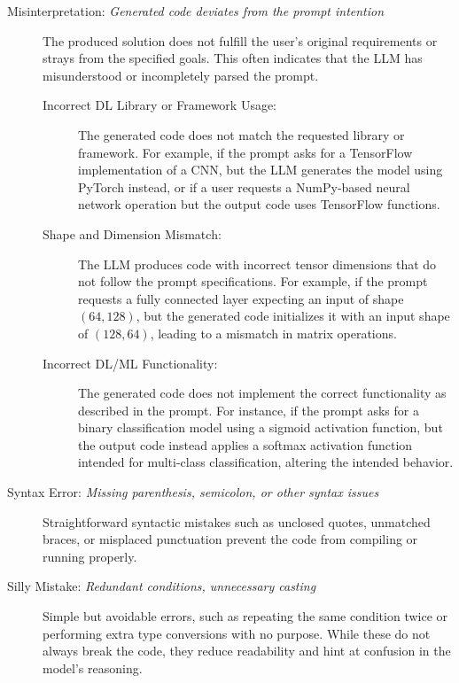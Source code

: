 \begin{description}

\item[Misinterpretation: \textit{Generated code deviates from the prompt intention}]  
The produced solution does not fulfill the user’s original requirements or strays from the specified goals. This often indicates that the LLM has misunderstood or incompletely parsed the prompt.
    
\begin{description}
\item[Incorrect DL Library or Framework Usage:] The generated code does not match the requested library or framework. For example, if the prompt asks for a TensorFlow implementation of a CNN, but the LLM generates the model using PyTorch instead, or if a user requests a NumPy-based neural network operation but the output code uses TensorFlow functions.

    \item[Shape and Dimension Mismatch:] The LLM produces code with incorrect tensor dimensions that do not follow the prompt specifications. For example, if the prompt requests a fully connected layer expecting an input of shape $(64, 128)$, but the generated code initializes it with an input shape of $(128, 64)$, leading to a mismatch in matrix operations.

    \item[Incorrect DL/ML Functionality:] The generated code does not implement the correct functionality as described in the prompt. For instance, if the prompt asks for a binary classification model using a sigmoid activation function, but the output code instead applies a softmax activation function intended for multi-class classification, altering the intended behavior.
    
    
\end{description}
    
\item[Syntax Error: \textit{Missing parenthesis, semicolon, or other syntax issues}]
Straightforward syntactic mistakes such as unclosed quotes, unmatched braces, or misplaced punctuation prevent the code from compiling or running properly.

\item[Silly Mistake: \textit{Redundant conditions, unnecessary casting}] 
Simple but avoidable errors, such as repeating the same condition twice or performing extra type conversions with no purpose. While these do not always break the code, they reduce readability and hint at confusion in the model's reasoning.


\end{description}
